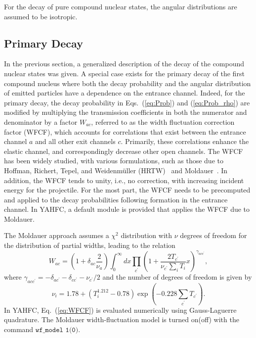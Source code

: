 \documentclass[
10pt,
showpacs,preprintnumbers,footinbib,
amsfonts,amsmath,amssymb,
aps,
prc,twocolumn,groupedaddress,superscriptaddress,
showkeys,
nofootinbib
]{revtex4-1}
\begin{document}
For the decay of pure compound nuclear states, the angular distributions are assumed to be isotropic. 

\subsection{Primary Decay}

In the previous section, a generalized description of the decay of the compound nuclear states was given. A special case exists for the primary decay of the first compound nucleus where both the decay probability and the angular distribution of emitted particles have a dependence on the entrance channel. Indeed, for the primary decay, the decay probability in Eqs.~(\ref{eq:Prob}) and (\ref{eq:Prob_rho}) are modified by multiplying the transmission coefficients in both the numerator and denominator by a factor $W_{ac}$, referred to as the width fluctuation correction factor (WFCF), which accounts for correlations that exist between the entrance channel $a$ and all other exit channels $c$. Primarily, these correlations enhance the elastic channel, and correspondingly decrease other open channels. The WFCF has been widely studied, with various formulations, such as those due to Hoffman, Richert, Tepel, and Weidenm\" uller (HRTW)~\cite{Tepel:1974,Hofmann:1975,Hofmann:1980} and Moldauer~\cite{Moldauer:1976,Moldauer:1980}. In addition, the WFCF tends to unity, i.e., no correction, with increasing incident energy for the projectile. For the most part, the WFCF needs to be precomputed and applied to the decay probabilities following formation in the entrance channel. In YAHFC, a default module is provided that applies the WFCF due to Moldauer. 

The Moldauer approach assumes a $\chi^2$ distribution with $\nu$ degrees of freedom for the distribution of partial widths, leading to the relation
\begin{equation}
W_{ac} = \left(1+\delta_{ac}\frac{2}{\nu_a}\right) \int_0^\infty dx \prod_{c^\prime}\left( 1 + \frac{2T_{c^\prime}}{\nu_{c^\prime} \sum_iT_i}x\right)^{\gamma_{acc^\prime}},
\label{eq:WFCF}
\end{equation}
where $\gamma_{acc^\prime} = -\delta_{ac^\prime} - \delta_{cc^\prime} - \nu_{c^\prime}/2$ and the number of degrees of freedom is given by
\begin{equation}
\nu_i = 1.78 +(T_i^{1.212} - 0.78)\exp\left( -0.228\sum_{c^\prime} T_{c^\prime}\right).
\end{equation}
In YAHFC, Eq.~(\ref{eq:WFCF}) is evaluated numerically using Gauss-Laguerre quadrature. The Moldauer width-fluctuation model is turned on(off) with the command ${\texttt{wf\_model 1(0)}}$. 
\end{document}
